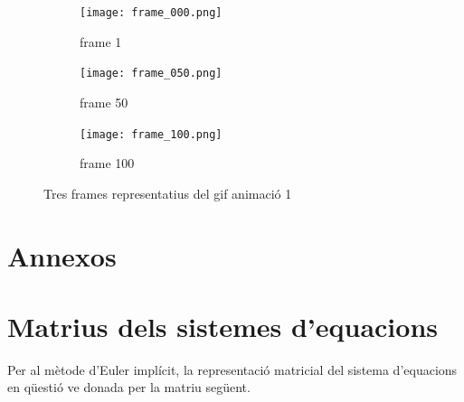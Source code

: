\documentclass[11pt]{article}
\begin{document}
\begin{figure}[hbt!]
    \centering
    \begin{subfigure}{0.3\textwidth}
        \centering
        \texttt{[image: frame\_000.png]}
        \caption{frame 1}
    \end{subfigure}
    \hspace{0.01\textwidth}
    \begin{subfigure}{0.3\textwidth}
        \centering
        \texttt{[image: frame\_050.png]}
        \caption{frame 50}
    \end{subfigure}
    \hspace{0.01\textwidth}
    \begin{subfigure}{0.3\textwidth}
        \centering
        \texttt{[image: frame\_100.png]}
        \caption{frame 100}
    \end{subfigure}

    \caption{Tres frames representatius del gif animació 1}
    \label{fig:dues_imatges}
\end{figure}


\section*{Annexos}
\appendix

\section{Matrius dels sistemes d'equacions} \label{subsec: matrius}

Per al mètode d'Euler implícit, la representació matricial del sistema d'equacions en qüestió ve donada per la matriu següent.
\end{document}
